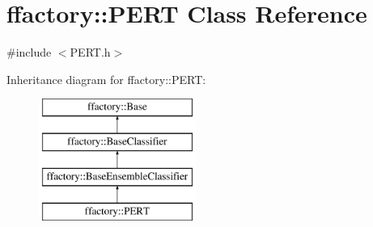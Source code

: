 \hypertarget{classffactory_1_1_p_e_r_t}{\section{ffactory\-:\-:P\-E\-R\-T Class Reference}
\label{classffactory_1_1_p_e_r_t}
}


{\ttfamily \#include $<$P\-E\-R\-T.\-h$>$}

Inheritance diagram for ffactory\-:\-:P\-E\-R\-T\-:\begin{figure}[H]
\begin{center}
\leavevmode
\includegraphics[height=4.000000cm]{classffactory_1_1_p_e_r_t}
\end{center}
\end{figure}
